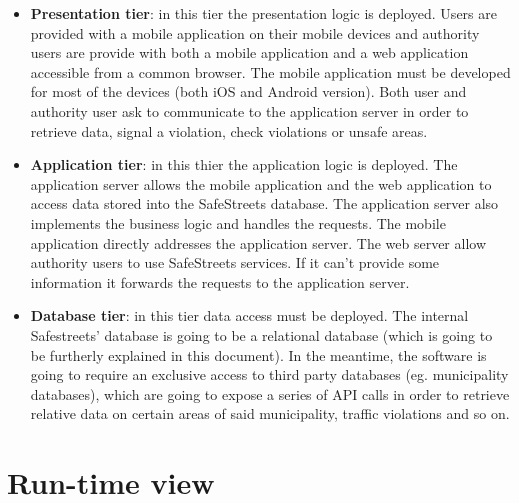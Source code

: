     \begin{itemize}
        \item \textbf{Presentation tier}: in this tier the presentation logic is
        deployed. Users are provided with a mobile application on their mobile
        devices and authority users are provide with both a mobile application
        and a web application accessible from a common browser. The mobile
        application must be developed for most of the devices (both iOS and
        Android version). Both user and authority user ask to communicate to the
        application server in order to retrieve data, signal a violation, check
        violations or unsafe areas.
        \newpage
        \item \textbf{Application tier}: in this thier the application logic is
        deployed. The application server allows the mobile application and the
        web application to access data stored into the SafeStreets database. The
        application server also implements the business logic and handles the
        requests. The mobile application directly addresses the application
        server. The web server allow authority users to use SafeStreets
        services. If it can't provide some information it forwards the requests
        to the application server.
        \item \textbf{Database tier}: in this tier data access must be deployed.
        The internal Safestreets' database is going to be a relational database
        (which is going to be furtherly explained in this document). In the
        meantime, the software is going to require an exclusive access to third
        party databases (eg. municipality databases), which are going to expose
        a series of API calls in order to retrieve relative data on certain
        areas of said municipality, traffic violations and so on.
    \end{itemize} 
    \newpage   
    \section{Run-time view}
